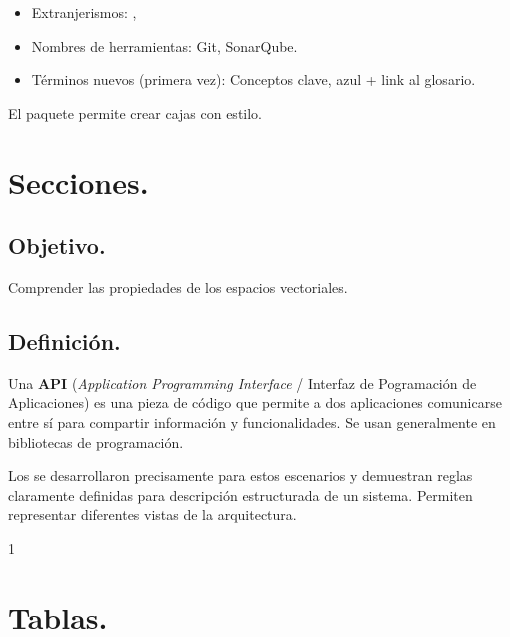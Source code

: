 \begin{itemize}
    \item Extranjerismos: ,%
    \item Nombres de herramientas: Git, SonarQube.
    \item Términos nuevos (primera vez): Conceptos clave,  azul + link al glosario.    

\end{itemize}

El paquete  permite crear cajas con estilo.



\section{Secciones.}

    \subsection{Objetivo.}

    \begin{nkObjective}
        Comprender las propiedades de los espacios vectoriales.
    \end{nkObjective}
    
    \subsection{Definición.}
    
    \begin{definition}
        \label{def:definition_api}
        Una \textbf{\gls{API}} (\textit{Application Programming Interface} / Interfaz de Pogramación de Aplicaciones) es una pieza de código que permite a dos aplicaciones comunicarse entre sí para compartir información y funcionalidades. Se usan generalmente en bibliotecas de programación.
    \end{definition}
    
    
    
    \begin{definition}
        \label{def:definition_example}
        Los  se desarrollaron precisamente para estos escenarios y demuestran reglas claramente definidas para descripción estructurada de un sistema. Permiten representar diferentes vistas de la arquitectura.
    \end{definition}
1
\section{Tablas.}


